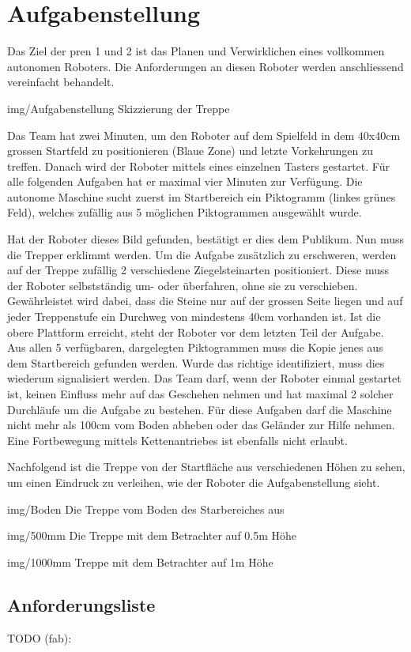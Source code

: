 \section{Aufgabenstellung}

Das Ziel der \acrfull{pren} 1 und 2 ist das Planen und Verwirklichen eines vollkommen autonomen Roboters. Die Anforderungen an diesen Roboter werden anschliessend vereinfacht behandelt. 

\image
 {img/Aufgabenstellung}
 {Skizzierung der Treppe}
 
Das Team hat zwei Minuten, um den Roboter auf dem Spielfeld in dem 40x40cm grossen 
Startfeld zu positionieren (Blaue Zone) und letzte Vorkehrungen zu treffen. 
Danach wird der Roboter mittels eines einzelnen Tasters gestartet. 
Für alle folgenden Aufgaben hat er maximal vier Minuten zur Verfügung. 
Die autonome Maschine sucht zuerst im Startbereich ein Piktogramm 
(linkes grünes Feld), welches zufällig aus 5 möglichen Piktogrammen ausgewählt wurde. 

Hat der Roboter dieses Bild gefunden, bestätigt er dies dem Publikum. 
Nun muss die Trepper erklimmt werden. Um die Aufgabe zusätzlich zu erschweren,
werden auf der Treppe zufällig 2 verschiedene Ziegelsteinarten positioniert. 
Diese muss der Roboter selbstständig um- oder überfahren, ohne sie zu verschieben.
Gewährleistet wird dabei, dass die Steine nur auf der grossen Seite liegen 
und auf jeder Treppenstufe ein Durchweg von mindestens 40cm vorhanden ist. 
Ist die obere Plattform erreicht, steht der Roboter vor dem letzten Teil der Aufgabe. 
Aus allen 5 verfügbaren, dargelegten Piktogrammen muss die Kopie jenes aus dem 
Startbereich gefunden werden. Wurde das richtige identifiziert, 
muss dies wiederum signalisiert werden. Das Team darf,
wenn der Roboter einmal gestartet ist, 
keinen Einfluss mehr auf das Geschehen nehmen und hat maximal 2 solcher Durchläufe 
um die Aufgabe zu bestehen. Für diese Aufgaben darf die Maschine nicht mehr 
als 100cm vom Boden abheben oder das Geländer zur Hilfe nehmen. 
Eine Fortbewegung mittels Kettenantriebes ist ebenfalls nicht erlaubt.

Nachfolgend ist die Treppe von der Startfläche aus verschiedenen Höhen zu sehen, um einen Eindruck zu verleihen, wie der Roboter die Aufgabenstellung sieht.

\image
  {img/Boden}
  {Die Treppe vom Boden des Starbereiches aus}
 
\image
 {img/500mm}
 {Die Treppe mit dem Betrachter auf 0.5m Höhe}
 
\image
 {img/1000mm}
 {Treppe mit dem Betrachter auf 1m Höhe}

\subsection{Anforderungsliste}
\label{sec:anforderungsliste}

TODO (fab):